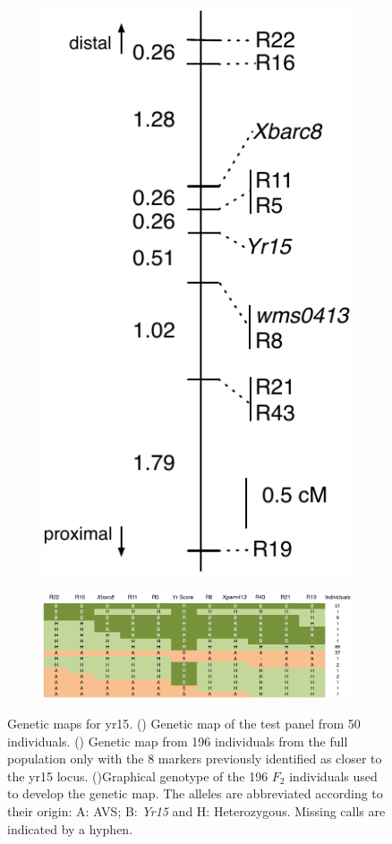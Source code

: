 \begin{figure}
\begin{subfigure}{0.45\textwidth}
	\includegraphics[height=0.45\textheight]{Yr15/Figures/selection/fineMap.pdf}
	\end{subfigure}

	\begin{subfigure}{1\textwidth}
	\caption{}
	\label{fig:yr15:mapDetails}
	\includegraphics[width=1\textwidth]{Yr15/Figures/selection/mapDetails.pdf}
	\end{subfigure}
	

	\caption[Genetic maps for \acrshort{yr15}.]{Genetic maps for \acrshort{yr15}. () Genetic map of the test panel from 50 individuals. () Genetic map from 196 individuals from the full population only with the 8 markers previously identified as closer to the \acrshort{yr15} locus. ()Graphical genotype of the 196 $F_{2}$ individuals used to develop the genetic map. The alleles are abbreviated according to their origin: A: AVS; B: \textit{Yr15} and H: Heterozygous. Missing calls are indicated by a hyphen.}
\end{figure}

